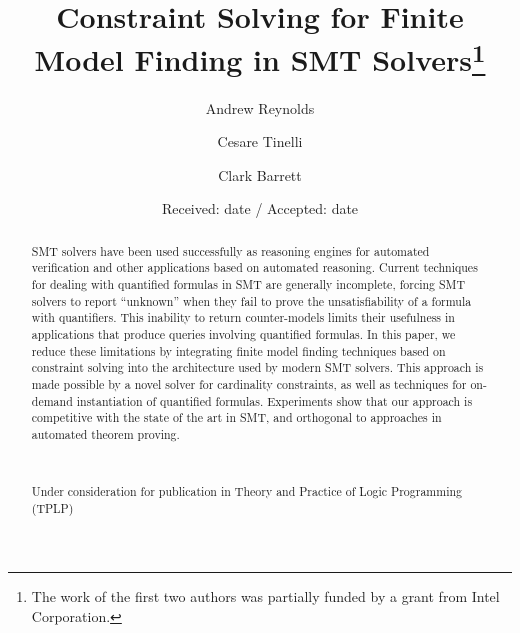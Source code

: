 \documentclass{svjour3}                     %
\begin{document}
\title{Constraint Solving for Finite Model Finding in SMT Solvers\thanks{
The work of the first two authors was partially funded 
by a grant from Intel Corporation.
}
}


\author{
Andrew Reynolds \and 
Cesare Tinelli \and 
Clark Barrett
}



\date{Received: date / Accepted: date}


\maketitle

\begin{abstract}
SMT solvers have been used successfully as reasoning engines for automated verification and other applications based on automated reasoning. Current techniques for dealing with quantified formulas in SMT are generally incomplete, forcing SMT solvers to report ``unknown'' when they fail to prove the unsatisfiability of a formula with quantifiers. This inability to return counter-models limits their usefulness in applications that produce queries involving quantified formulas. In this paper, we reduce these limitations by integrating finite model finding techniques based on constraint solving into the architecture used by modern SMT solvers. This approach is made possible by a novel solver for cardinality constraints, as well as techniques for on-demand instantiation of quantified formulas. Experiments show that our approach is competitive with the state of the art in SMT, and orthogonal to approaches in automated theorem proving.

\ 

\noindent
Under consideration for publication in Theory and Practice of Logic Programming (TPLP)
\end{abstract}
\end{document}
